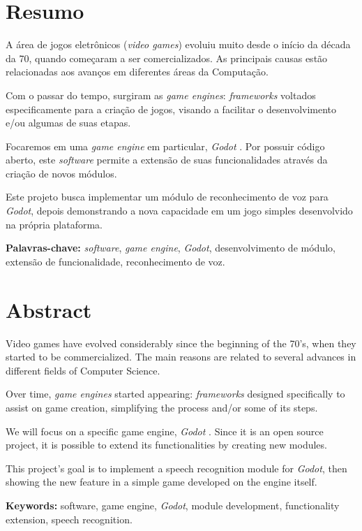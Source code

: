 
\chapter*{Resumo}

A área de jogos eletrônicos (\textit{video games}) evoluiu muito desde o início da década da 70, quando começaram a ser comercializados. As principais causas estão relacionadas aos avanços em diferentes áreas da Computação.

Com o passar do tempo, surgiram as \emph{game engines}: \textit{frameworks} voltados especificamente para a criação de jogos, visando a facilitar o desenvolvimento e/ou algumas de suas etapas.

Focaremos em uma \textit{game engine} em particular, \emph{Godot} \citep{godot}. Por possuir código aberto, este \textit{software} permite a extensão de suas funcionalidades através da criação de novos módulos.

Este projeto busca implementar um módulo de reconhecimento de voz para \textit{Godot}, depois demonstrando a nova capacidade em um jogo simples desenvolvido na própria plataforma.
\par
\bigskip
\noindent \textbf{Palavras-chave:} \textit{software}, \textit{game engine}, \textit{Godot}, desenvolvimento de módulo, extensão de funcionalidade, reconhecimento de voz.


\chapter*{Abstract}

Video games have evolved considerably since the beginning of the 70's, when they started to be commercialized. The main reasons are related to several advances in different fields of Computer Science.

Over time, \emph{game engines} started appearing: \textit{frameworks} designed specifically to assist on game creation, simplifying the process and/or some of its steps.

We will focus on a specific game engine, \emph{Godot} \citep{godot}. Since it is an open source project, it is possible to extend its functionalities by creating new modules.

This project's goal is to implement a speech recognition module for \textit{Godot}, then showing the new feature in a simple game developed on the engine itself.
\par
\bigskip
\noindent \textbf{Keywords:} software, game engine, \textit{Godot}, module development, functionality extension, speech recognition.
